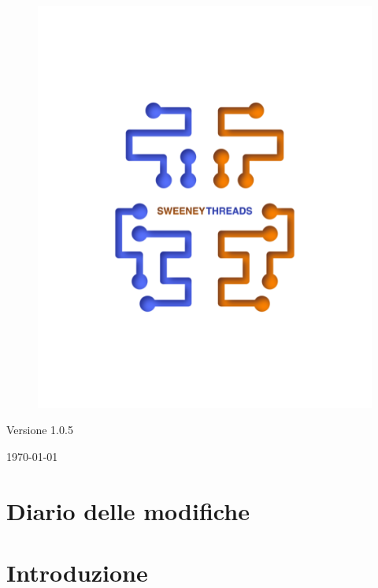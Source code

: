 \documentclass[a4paper]{article}
\begin{document}
\begin{titlepage}
		\begin{figure}[H]
			\centering
			\includegraphics[scale=0.8]{sweeney.png}
		\end{figure}
		\begin{center}
			Versione 1.0.5
		\end{center}
		{\large \today}\\[3cm] 
		\vfill  
	\end{titlepage}
	
	
	\tableofcontents
	
	\newpage 
	\section*{Diario delle modifiche}

	\newpage \section{Introduzione}
\end{document}
